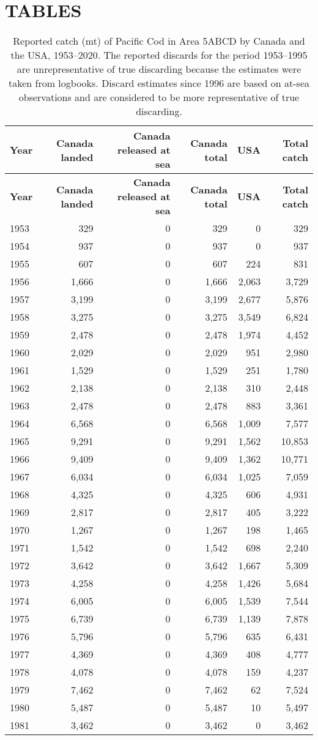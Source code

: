 \documentclass[11pt]{book}
\begin{document}
\hypertarget{sec:tables}{%
\section{TABLES}\label{sec:tables}}
\begin{longtable}[]{@{}lrrrrr@{}}
\caption{\label{tab:tab-catch-5abcd}Reported catch (mt) of Pacific Cod in Area 5ABCD by Canada and the USA, 1953--2020. The reported discards for the period 1953--1995 are unrepresentative of true discarding because the estimates were taken from logbooks. Discard estimates since 1996 are based on at-sea observations and are considered to be more representative of true discarding.}\tabularnewline
\toprule
\textbf{Year} & \textbf{Canada landed} & \textbf{Canada released at sea} & \textbf{Canada total} & \textbf{USA} & \textbf{Total catch}\tabularnewline
\midrule
\endfirsthead
\toprule
\textbf{Year} & \textbf{Canada landed} & \textbf{Canada released at sea} & \textbf{Canada total} & \textbf{USA} & \textbf{Total catch}\tabularnewline
\midrule
\endhead
1953 & 329 & 0 & 329 & 0 & 329\tabularnewline
1954 & 937 & 0 & 937 & 0 & 937\tabularnewline
1955 & 607 & 0 & 607 & 224 & 831\tabularnewline
1956 & 1,666 & 0 & 1,666 & 2,063 & 3,729\tabularnewline
1957 & 3,199 & 0 & 3,199 & 2,677 & 5,876\tabularnewline
1958 & 3,275 & 0 & 3,275 & 3,549 & 6,824\tabularnewline
1959 & 2,478 & 0 & 2,478 & 1,974 & 4,452\tabularnewline
1960 & 2,029 & 0 & 2,029 & 951 & 2,980\tabularnewline
1961 & 1,529 & 0 & 1,529 & 251 & 1,780\tabularnewline
1962 & 2,138 & 0 & 2,138 & 310 & 2,448\tabularnewline
1963 & 2,478 & 0 & 2,478 & 883 & 3,361\tabularnewline
1964 & 6,568 & 0 & 6,568 & 1,009 & 7,577\tabularnewline
1965 & 9,291 & 0 & 9,291 & 1,562 & 10,853\tabularnewline
1966 & 9,409 & 0 & 9,409 & 1,362 & 10,771\tabularnewline
1967 & 6,034 & 0 & 6,034 & 1,025 & 7,059\tabularnewline
1968 & 4,325 & 0 & 4,325 & 606 & 4,931\tabularnewline
1969 & 2,817 & 0 & 2,817 & 405 & 3,222\tabularnewline
1970 & 1,267 & 0 & 1,267 & 198 & 1,465\tabularnewline
1971 & 1,542 & 0 & 1,542 & 698 & 2,240\tabularnewline
1972 & 3,642 & 0 & 3,642 & 1,667 & 5,309\tabularnewline
1973 & 4,258 & 0 & 4,258 & 1,426 & 5,684\tabularnewline
1974 & 6,005 & 0 & 6,005 & 1,539 & 7,544\tabularnewline
1975 & 6,739 & 0 & 6,739 & 1,139 & 7,878\tabularnewline
1976 & 5,796 & 0 & 5,796 & 635 & 6,431\tabularnewline
1977 & 4,369 & 0 & 4,369 & 408 & 4,777\tabularnewline
1978 & 4,078 & 0 & 4,078 & 159 & 4,237\tabularnewline
1979 & 7,462 & 0 & 7,462 & 62 & 7,524\tabularnewline
1980 & 5,487 & 0 & 5,487 & 10 & 5,497\tabularnewline
1981 & 3,462 & 0 & 3,462 & 0 & 3,462\tabularnewline

\end{longtable}
\end{document}
